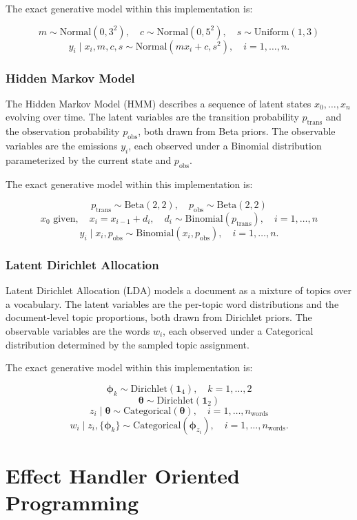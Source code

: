 \documentclass[logo,bsc,singlespacing,parskip,online]{infthesis}
\begin{document}
The exact generative model within this implementation is:

\[
m \sim \text{Normal}(0, 3^2), \quad
c \sim \text{Normal}(0, 5^2), \quad
s \sim \text{Uniform}(1, 3)
\]
\[
y_i \mid x_i, m, c, s \sim \text{Normal}(m x_i + c, s^2), \quad i = 1, \ldots, n.
\]

\subsubsection{Hidden Markov Model}
The Hidden Markov Model (HMM) describes a sequence of latent states $x_0, \ldots, x_n$ evolving over time. 
The latent variables are the transition probability $p_{\text{trans}}$ and the observation probability $p_{\text{obs}}$, both drawn from Beta priors. 
The observable variables are the emissions $y_i$, each observed under a Binomial distribution parameterized by the current state and $p_{\text{obs}}$.

The exact generative model within this implementation is:

\[
p_{\text{trans}} \sim \text{Beta}(2, 2), \quad
p_{\text{obs}} \sim \text{Beta}(2, 2)
\]
\[
x_0 \text{ given}, \quad
x_i = x_{i-1} + d_i,\quad
d_i \sim \text{Binomial}(p_{\text{trans}}), \quad i = 1,\ldots,n
\]
\[
y_i \mid x_i, p_{\text{obs}} \sim \text{Binomial}(x_i, p_{\text{obs}}), \quad i = 1,\ldots,n.
\]

\subsubsection{Latent Dirichlet Allocation}
Latent Dirichlet Allocation (LDA) models a document as a mixture of topics over a vocabulary. 
The latent variables are the per-topic word distributions and the document-level topic proportions, both drawn from Dirichlet priors. 
The observable variables are the words $w_i$, each observed under a Categorical distribution determined by the sampled topic assignment.

The exact generative model within this implementation is:

\[
\boldsymbol{\phi}_k \sim \text{Dirichlet}(\mathbf{1}_4), \quad k = 1,\ldots,2
\]
\[
\boldsymbol{\theta} \sim \text{Dirichlet}(\mathbf{1}_2)
\]
\[
z_i \mid \boldsymbol{\theta} \sim \text{Categorical}(\boldsymbol{\theta}), \quad i = 1,\ldots,n_{\text{words}}
\]
\[
w_i \mid z_i, \{\boldsymbol{\phi}_k\} \sim \text{Categorical}(\boldsymbol{\phi}_{z_i}), \quad i = 1,\ldots,n_{\text{words}}.
\]

\section{Effect Handler Oriented Programming}
\end{document}
